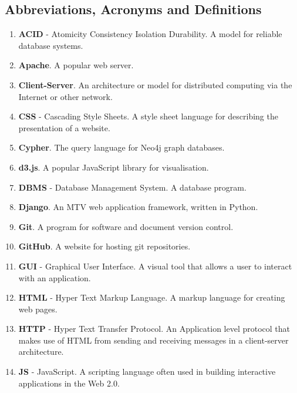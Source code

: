 \documentclass[12pt,onecolumn]{article}
\begin{document}
	\subsection{Abbreviations, Acronyms and Definitions} %

	\begin{enumerate}
		\item \textbf{ACID} - Atomicity Consistency Isolation Durability. A model for reliable database systems.

		\item \textbf{Apache}. A popular web server.

		\item \textbf{Client-Server}. An architecture or model for distributed computing via the Internet or other network.

		\item \textbf{CSS} - Cascading Style Sheets. A style sheet language for describing the presentation of a website.

		\item \textbf{Cypher}. The query language for Neo4j graph databases.

		\item \textbf{d3.js}. A popular JavaScript library for visualisation.

		\item \textbf{DBMS} - Database Management System. A database program.

		\item \textbf{Django}. An MTV web application framework, written in Python.

		\item \textbf{Git}. A program for software and document version control.

		\item \textbf{GitHub}. A website for hosting git repositories.

		\item \textbf{GUI} - Graphical User Interface. A visual tool that allows a user to interact with an application.

		\item \textbf{HTML} - Hyper Text Markup Language. A markup language for creating web pages.

		\item \textbf{HTTP} - Hyper Text Transfer Protocol. An Application level protocol that makes use of HTML from sending and receiving messages in a client-server architecture.

		\item \textbf{JS} - JavaScript. A scripting language often used in building interactive applications in the Web 2.0.


\end{enumerate}
\end{document}
